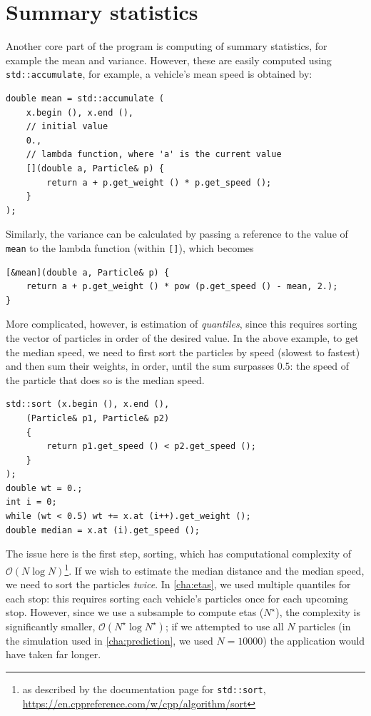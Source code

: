 \section{Summary statistics}
\label{app:particle-summaries}

Another core part of the program is computing of summary statistics, for example the mean and variance. However, these are easily computed using \verb+std::accumulate+, for example, a vehicle's mean speed is obtained by:
\begin{lstlisting}
double mean = std::accumulate (
    x.begin (), x.end (),
    // initial value
    0.,
    // lambda function, where 'a' is the current value
    [](double a, Particle& p) {
        return a + p.get_weight () * p.get_speed ();
    }
);
\end{lstlisting}
Similarly, the variance can be calculated by passing a reference to the value of \verb+mean+ to the lambda function (within \verb+[]+), which becomes
\begin{lstlisting}
[&mean](double a, Particle& p) {
    return a + p.get_weight () * pow (p.get_speed () - mean, 2.);
}
\end{lstlisting}

More complicated, however, is estimation of \emph{quantiles}, since this requires sorting the vector of particles in order of the desired value. In the above example, to get the median speed, we need to first sort the particles by speed (slowest to fastest) and then sum their weights, in order, until the sum surpasses 0.5: the speed of the particle that does so is the median speed.
\begin{lstlisting}
std::sort (x.begin (), x.end (),
    (Particle& p1, Particle& p2)
    {
        return p1.get_speed () < p2.get_speed ();
    }
);
double wt = 0.;
int i = 0;
while (wt < 0.5) wt += x.at (i++).get_weight ();
double median = x.at (i).get_speed ();
\end{lstlisting}

The issue here is the first step, sorting, which has computational complexity of $\mathcal{O}(N\log N)$\footnote{as described by the documentation page for \verb+std::sort+, \url{https://en.cppreference.com/w/cpp/algorithm/sort}}. If we wish to estimate the median distance and the median speed, we need to sort the particles \emph{twice}. In \cref{cha:etas}, we used multiple quantiles for each stop: this requires sorting each vehicle's particles once for each upcoming stop. However, since we use a subsample to compute \glspl{eta} ($N^\star$), the complexity is significantly smaller, $\mathcal{O}(N^\star\log N^\star)$; if we attempted to use all $N$ particles (in the simulation used in \cref{cha:prediction}, we used $N=10000$) the application would have taken far longer.
